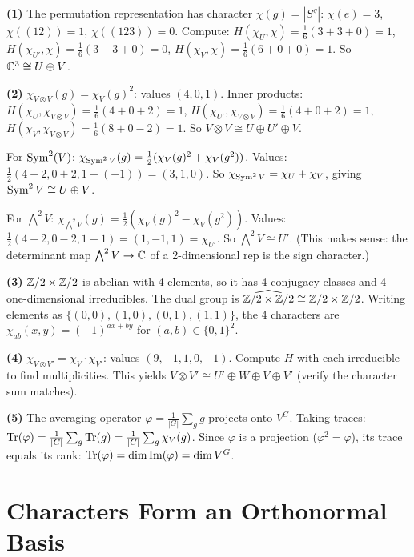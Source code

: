 \documentclass{report}
\begin{document}
\begin{solution}
\textbf{(1)} The permutation representation has character \(\chi(g) = |S^g|\): \(\chi(e) = 3\), \(\chi((12)) = 1\), \(\chi((123)) = 0\). Compute: \(H(\chi_U, \chi) = \frac{1}{6}(3 + 3 + 0) = 1\), \(H(\chi_{U'}, \chi) = \frac{1}{6}(3 - 3 + 0) = 0\), \(H(\chi_V, \chi) = \frac{1}{6}(6 + 0 + 0) = 1\). So \(\CC^3 \cong U \oplus V\).

\textbf{(2)} \(\chi_{V \otimes V}(g) = \chi_V(g)^2\): values \((4, 0, 1)\). Inner products: \(H(\chi_U, \chi_{V \otimes V}) = \frac{1}{6}(4 + 0 + 2) = 1\), \(H(\chi_{U'}, \chi_{V \otimes V}) = \frac{1}{6}(4 + 0 + 2) = 1\), \(H(\chi_V, \chi_{V \otimes V}) = \frac{1}{6}(8 + 0 - 2) = 1\). So \(V \otimes V \cong U \oplus U' \oplus V\).

For \(\operatorname{Sym}^2(V)\): \(\chi_{\operatorname{Sym}^2 V}(g) = \frac{1}{2}(\chi_V(g)^2 + \chi_V(g^2))\). Values: \(\frac{1}{2}(4 + 2, 0 + 2, 1 + (-1)) = (3, 1, 0)\). So \(\chi_{\operatorname{Sym}^2 V} = \chi_U + \chi_V\), giving \(\operatorname{Sym}^2 V \cong U \oplus V\).

For \(\bigwedge^2 V\): \(\chi_{\bigwedge^2 V}(g) = \frac{1}{2}(\chi_V(g)^2 - \chi_V(g^2))\). Values: \(\frac{1}{2}(4 - 2, 0 - 2, 1 + 1) = (1, -1, 1) = \chi_{U'}\). So \(\bigwedge^2 V \cong U'\). (This makes sense: the determinant map \(\bigwedge^2 V \to \CC\) of a 2-dimensional rep is the sign character.)

\textbf{(3)} \(\ZZ/2 \times \ZZ/2\) is abelian with 4 elements, so it has 4 conjugacy classes and 4 one-dimensional irreducibles. The dual group is \(\widehat{\ZZ/2 \times \ZZ/2} \cong \ZZ/2 \times \ZZ/2\). Writing elements as \(\{(0,0), (1,0), (0,1), (1,1)\}\), the 4 characters are \(\chi_{ab}(x, y) = (-1)^{ax + by}\) for \((a, b) \in \{0,1\}^2\).

\textbf{(4)} \(\chi_{V \otimes V'} = \chi_V \cdot \chi_{V'}\): values \((9, -1, 1, 0, -1)\). Compute \(H\) with each irreducible to find multiplicities. This yields \(V \otimes V' \cong U' \oplus W \oplus V \oplus V'\) (verify the character sum matches).

\textbf{(5)} The averaging operator \(\varphi = \frac{1}{|G|} \sum_g g\) projects onto \(V^G\). Taking traces: \(\operatorname{Tr}(\varphi) = \frac{1}{|G|} \sum_g \operatorname{Tr}(g) = \frac{1}{|G|} \sum_g \chi_V(g)\). Since \(\varphi\) is a projection (\(\varphi^2 = \varphi\)), its trace equals its rank: \(\operatorname{Tr}(\varphi) = \dim \operatorname{Im}(\varphi) = \dim V^G\).
\end{solution}



\section{Characters Form an Orthonormal Basis}
\end{document}
